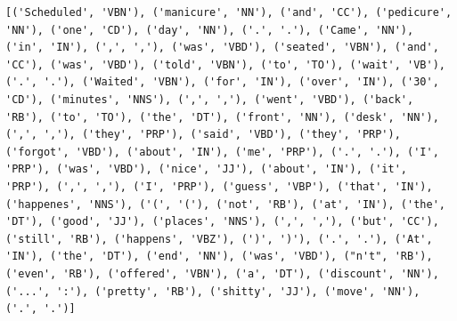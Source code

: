 \begin{Verbatim}[breaklines=true, breakanywhere=true] 
[('Scheduled', 'VBN'), ('manicure', 'NN'), ('and', 'CC'), ('pedicure', 'NN'), ('one', 'CD'), ('day', 'NN'), ('.', '.'), ('Came', 'NN'), ('in', 'IN'), (',', ','), ('was', 'VBD'), ('seated', 'VBN'), ('and', 'CC'), ('was', 'VBD'), ('told', 'VBN'), ('to', 'TO'), ('wait', 'VB'), ('.', '.'), ('Waited', 'VBN'), ('for', 'IN'), ('over', 'IN'), ('30', 'CD'), ('minutes', 'NNS'), (',', ','), ('went', 'VBD'), ('back', 'RB'), ('to', 'TO'), ('the', 'DT'), ('front', 'NN'), ('desk', 'NN'), (',', ','), ('they', 'PRP'), ('said', 'VBD'), ('they', 'PRP'), ('forgot', 'VBD'), ('about', 'IN'), ('me', 'PRP'), ('.', '.'), ('I', 'PRP'), ('was', 'VBD'), ('nice', 'JJ'), ('about', 'IN'), ('it', 'PRP'), (',', ','), ('I', 'PRP'), ('guess', 'VBP'), ('that', 'IN'), ('happenes', 'NNS'), ('(', '('), ('not', 'RB'), ('at', 'IN'), ('the', 'DT'), ('good', 'JJ'), ('places', 'NNS'), (',', ','), ('but', 'CC'), ('still', 'RB'), ('happens', 'VBZ'), (')', ')'), ('.', '.'), ('At', 'IN'), ('the', 'DT'), ('end', 'NN'), ('was', 'VBD'), ("n't", 'RB'), ('even', 'RB'), ('offered', 'VBN'), ('a', 'DT'), ('discount', 'NN'), ('...', ':'), ('pretty', 'RB'), ('shitty', 'JJ'), ('move', 'NN'), ('.', '.')]
\end{Verbatim}

